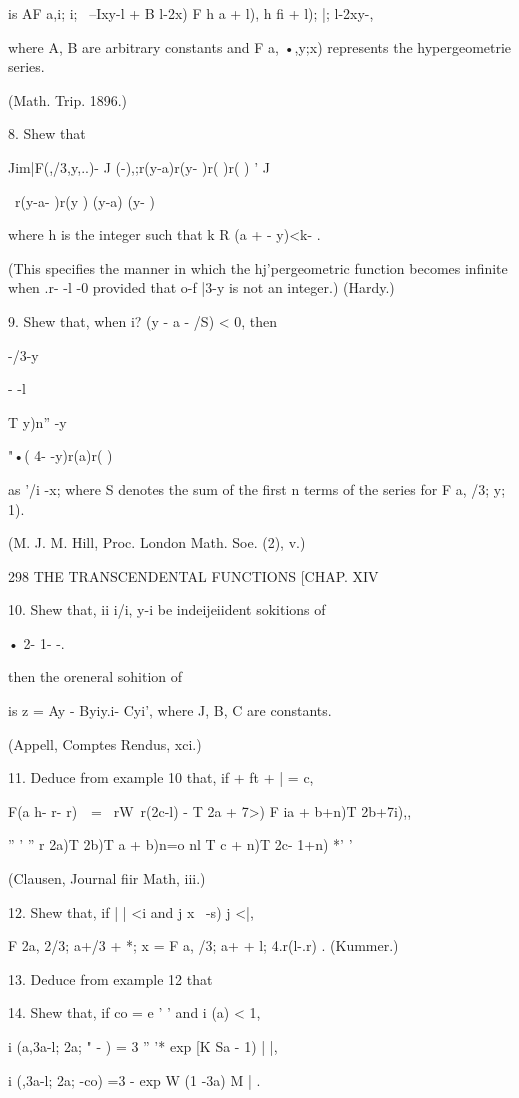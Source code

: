 is AF a,i; i; \ --Ixy-l + B l-2x) F h a + l), h fi + l); |; l-2xy-,

where A, B are arbitrary constants and F a, •,y;x) represents the
hypergeometrie series.

(Math. Trip. 1896.)

8. Shew that

Jim|F(,/3,y,..)- J (-),;r(y-a)r(y- )r( )r( ) ' J

\ r(y-a- )r(y ) (y-a) (y- )

where h is the integer such that k R (a + - y)<k- .

(This specifies the manner in which the hj'pergeometric function
becomes infinite when .r- -l -0 provided that o-f |3-y is not an
integer.) (Hardy.)

9. Shew that, when i? (y - a - /S) < 0, then

-/3-y

- -l

T y)n'' -y

 "•( 4- -y)r(a)r( )

as '/i -x; where S denotes the sum of the first n terms of the series
for F a, /3; y; 1).

(M. J. M. Hill, Proc. London Math. Soe. (2), v.)

298 THE TRANSCENDENTAL FUNCTIONS [CHAP. XIV

10. Shew that, ii i/i, y-i be indeijeiident sokitions of

• 2- 1- -.

then the oreneral sohition of

is z = Ay - Byiy.i- Cyi', where J, B, C are constants.

(Appell, Comptes Rendus, xci.)

11. Deduce from example 10 that, if + ft + | = c,

 F(a h- r- r)\ \ = \ rW\ r(2c-l) - T 2a + 7>) F ia + b+n)T 2b+7i),,

'' ' '' r 2a)T 2b)T a + b)n=o nl T c + n)T 2c- 1+n) *' '

(Clausen, Journal fiir Math, iii.)

12. Shew that, if | | <i and j x \ -s) j <|,

F 2a, 2/3; a+/3 + *; x = F a, /3; a+ + l; 4.r(l-.r) . (Kummer.)

13. Deduce from example 12 that

14. Shew that, if co = e ' ' and i (a) < 1,

i (a,3a-l; 2a; " - ) = 3 '' '* exp [K Sa - 1) | |,

i (,3a-l; 2a; -co) =3 - exp W (1 -3a) M | .


